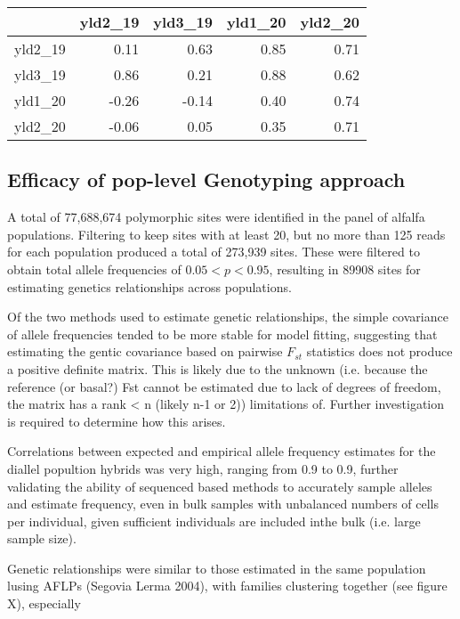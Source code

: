 \documentclass[12pt, letterpaper]{article}
\begin{document}
\begin{table}[ht]
\caption{}
\centering
\begin{tabular}{lrrrr}
  \hline
 & yld2\_19 & yld3\_19 & yld1\_20 & yld2\_20 \\ 
  \hline
yld2\_19 & 0.11 & 0.63 & 0.85 & 0.71 \\ 
  yld3\_19 & 0.86 & 0.21 & 0.88 & 0.62 \\ 
  yld1\_20 & -0.26 & -0.14 & 0.40 & 0.74 \\ 
  yld2\_20 & -0.06 & 0.05 & 0.35 & 0.71 \\ 
   \hline
\end{tabular}
\end{table}


 



\subsection{Efficacy of pop-level Genotyping approach}


	A total of 77,688,674 polymorphic sites were identified in the panel of alfalfa populations. Filtering to keep sites with at least 20, but no more than 125 reads for each population produced a total of 273,939 sites. These were filtered to obtain total allele frequencies of $0.05 < p < 0.95$, resulting in 89908 sites for estimating genetics relationships across populations.

	Of the two methods used to estimate genetic relationships, the simple covariance of allele frequencies tended to be more stable for model fitting, suggesting that estimating the gentic covariance based on pairwise $F_{st}$ statistics does not produce a positive definite matrix. This is likely due to the unknown (i.e. because the reference (or basal?)  Fst cannot be estimated due to lack of degrees of freedom, the matrix has a rank < n (likely n-1 or 2)) limitations of. Further investigation is required to determine how this arises. 

	Correlations between expected and empirical allele frequency estimates for the diallel popultion hybrids was very high, ranging from 0.9 to 0.9, further validating the ability of sequenced based methods to accurately sample alleles and estimate frequency, even in bulk samples with unbalanced numbers of cells per individual, given sufficient individuals are included inthe bulk (i.e. large sample size).

	Genetic relationships were similar to those estimated in the same population lusing AFLPs (Segovia Lerma 2004), with families clustering together (see figure X), especially 
\end{document}
